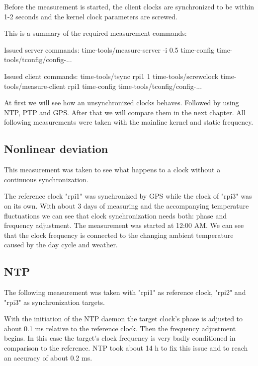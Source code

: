 Before the measurement is started, the client clocks are synchronized to be within 1-2 seconds and the kernel clock parameters are screwed.

This is a summary of the required measurement commands:

Issued server commands:
time-tools/measure-server -i 0.5
time-config time-tools/tconfig/config-...

Issued client commands:
time-tools/tsync rpi1 1
time-tools/screwclock
time-tools/measure-client rpi1
time-config time-tools/tconfig/config-...

At first we will see how an unsynchronized clocks behaves. Followed by using NTP, PTP and GPS. After that we will compare them in the next chapter. All following measurements were taken with the mainline kernel and static frequency.

\subsection{Nonlinear deviation}

This measurement was taken to see what happens to a clock without a continuous synchronization.


The reference clock "rpi1" was synchronized by GPS while the clock of "rpi3" was on its own. With about 3 days of measuring and the accompanying temperature fluctuations we can see that clock synchronization needs both: phase and frequency adjustment.
The measurement was started at 12:00 AM. We can see that the clock frequency is connected to the changing ambient temperature caused by the day cycle and weather.

\subsection{NTP}

The following measurement was taken with "rpi1" as reference clock, "rpi2" and "rpi3" as synchronization targets.


With the initiation of the NTP daemon the target clock's phase is adjusted to about 0.1 ms relative to the reference clock. Then the frequency adjustment begins. In this case the target’s clock frequency is very badly conditioned in comparison to the reference. NTP took about 14 h to fix this issue and to reach an accuracy of about 0.2 ms.


